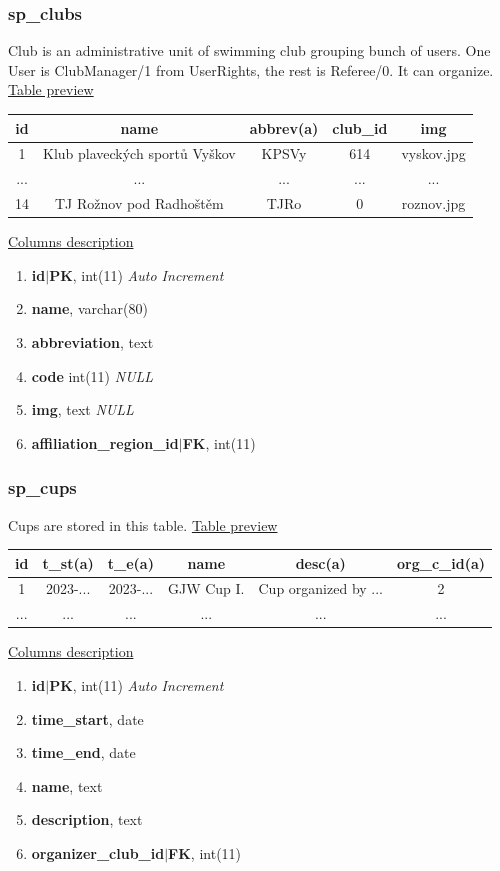 \subsubsection*{sp\_clubs}
Club is an administrative unit of swimming club grouping bunch of users. One User is ClubManager/1 from UserRights, the rest is Referee/0. It can organize.
\newline
\underline{Table preview}
\begin{center}
 \begin{tabular}{||c c c c c||} 
 \hline
 id & name & abbrev(a) & club\_id & img \\ [0.5ex] 
 \hline\hline
 1 & Klub plaveckých sportů Vyškov & KPSVy & 614 & vyskov.jpg \\  
 \hline
 ... & ... & ... & ... & ... \\ [0.5ex]
\hline
 14 & TJ Rožnov pod Radhoštěm & TJRo & 0 & roznov.jpg \\
 \hline
\end{tabular}
\end{center}
\underline{Columns description}
\begin{enumerate}
  \setlength\itemsep{0em}
  \item \textbf{id$|$PK}, int(11) \textit{Auto Increment}
  \item \textbf{name}, varchar(80)
  \item \textbf{abbreviation}, text
  \item \textbf{code} int(11) \textit{NULL}
  \item \textbf{img}, text \textit{NULL}
  \item \textbf{affiliation\_region\_id$|$FK}, int(11)
\end{enumerate}

\subsubsection*{sp\_cups}
Cups are stored in this table.
\newline
\underline{Table preview}
\begin{center}
 \begin{tabular}{||c c c c c c||} 
 \hline
 id & t\_st(a) & t\_e(a) & name & desc(a) & org\_c\_id(a) \\ [0.5ex] 
 \hline\hline
 1 & 2023-... & 2023-...& GJW Cup I. & Cup organized by ... & 2 \\ 
 \hline
 ... & ... & ... & ...&... & ...  \\ [0.5ex] 
 \hline
\end{tabular}
\end{center}
\underline{Columns description}
\begin{enumerate}
  \setlength\itemsep{0em}
  \item \textbf{id$|$PK}, int(11) \textit{Auto Increment}
  \item \textbf{time\_start}, date
  \item \textbf{time\_end}, date
  \item \textbf{name}, text
  \item \textbf{description}, text
  \item \textbf{organizer\_club\_id$|$FK}, int(11)
\end{enumerate}


